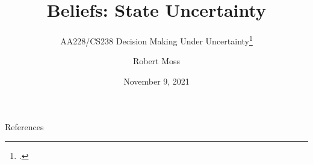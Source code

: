 \documentclass[aspectratio=169]{beamer}
\title{Beliefs: State Uncertainty}
\subtitle{AA228/CS238 Decision Making Under Uncertainty\footcite{Kochenderfer2020}}
\author{Robert Moss}
\institute{Stanford University}
\date{November 9, 2021}
\begin{document}
\begin{frame}
    \maketitle
\end{frame}















% 
% 



% 

% 
% 
% 
% 
% 
% 
% 




\begin{frame}{References}
    \renewcommand*{\bibfont}{\scriptsize}
    \printbibliography
\end{frame}
\end{document}
